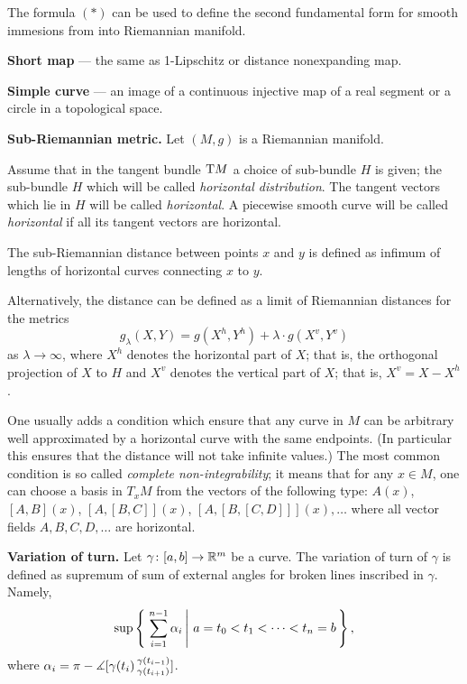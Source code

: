 \begin{description}
The formula $({*})$ can be used to define the second fundamental form for smooth immesions from into Riemannian manifold.

\item{\bf Short map}\label{Short map} --- the same as 1-Lipschitz 
or distance nonexpanding map.

\item{\bf Simple curve}\label{Simple curve} --- an image of a continuous injective map of a real segment or a circle in a topological space.

\item{\bf Sub-Riemannian metric.}\label{Sub-Riemannian metric}
Let $(M,g)$ is a Riemannian manifold.

Assume that in the tangent bundle $\mathrm{T} M$ 
a choice of sub-bundle $H$ is given;
the sub-bundle $H$ which will be called  \emph{horizontal distribution}.
The tangent vectors which lie in $H$ will be called \emph{horizontal}.
A piecewise smooth curve will be called \emph{horizontal}
if all its tangent vectors are horizontal.

The sub-Riemannian distance between points $x$ and $y$ is defined as infimum of lengths of horizontal curves connecting $x$ to $y$.

Alternatively, the distance can be defined as a limit of Riemannian distances 
for the metrics 
\[g_\lambda(X,Y)=g(X^h,Y^h)+\lambda\cdot g(X^v,Y^v)\] 
as $\lambda\to \infty$,
where $X^h$ denotes the horizontal part of $X$;
that is, the orthogonal projection of $X$ to $H$
and $X^v$ denotes the vertical part of $X$;
that is, $X^v=X-X^h$.

One usually adds a condition which ensure that any curve in $M$ can be arbitrary well approximated by a horizontal curve with the same endpoints.
(In particular this ensures that the distance will not take infinite values.)
The most common condition is so called  \emph{complete non-integrability};
it means that for any $x\in M$, 
one can choose a basis in $T_xM$
from the vectors of the following type:
$A(x)$, $[A,B](x)$, $[A,[B,C]](x)$, $[A,[B,[C,D]]](x),\dots$ where all vector fields $A,B,C,D, \dots$ are horizontal.


\item{\bf Variation of turn.}
\label{Variation of turn} 
Let $\gamma\colon[a,b]\to\mathbb{R}^m$ be a curve.
The variation of turn of $\gamma$ is defined as supremum of sum of external angles for broken lines inscribed in $\gamma$. 
Namely, 
$$\sup\set{\sum_{i=1}^{n-1}\alpha_i}{a=t_0<t_1<\dots<t_n=b},$$
where $\alpha_i=\pi-\measuredangle [\gamma(t_{i})\,{}^{\gamma(t_{i-1})}_{\gamma(t_{i+1})}]$.
\end{description}